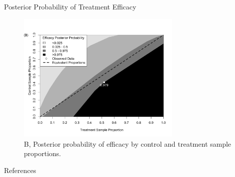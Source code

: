 \documentclass{beamer}
\begin{document}
\begin{frame}{Posterior Probability of Treatment Efficacy}
\begin{figure}[htbp]
\begin{center}
\includegraphics[width=0.7\textwidth]{./figures/2dpostp.png}
    \caption{B, Posterior probability of efficacy by control and treatment sample proportions.}
\label{fig:2dheatmaps}
 \end{center}
\end{figure}
\end{frame}





%

\begin{frame}{References}
% 

	
%
\end{frame}
\end{document}
